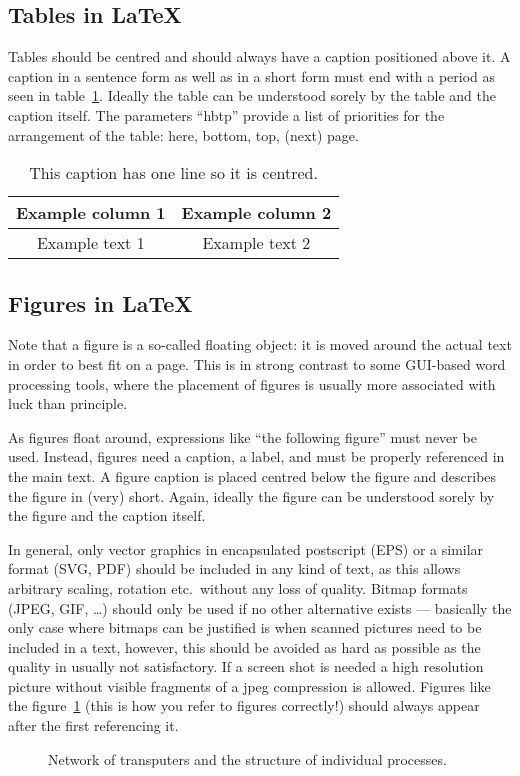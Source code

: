 \documentclass[12pt,twoside]{article}
\theoremstyle{plain}
\theoremstyle{definition}
\theoremstyle{remark}
\begin{document}
\subsection{Tables in \LaTeX}
\label{sec:model:subsec:tables}
Tables should be centred and should always have a caption positioned above it. A caption in a sentence form as well as in a short form must end with a period as seen in table~\ref{tab:sample}. Ideally the table can be understood sorely by the table and the caption itself. The parameters ``hbtp'' provide a list of priorities for the arrangement of the table: here, bottom, top, (next) page.

\begin{table}[hbtp] 
  \caption{This caption has one line so it is centred.}\label{tab:sample} 
  \centering
  \begin{tabular}{|c|c|}
    \hline
    Example column 1 & Example column 2 \\
    \hline
    Example text 1 & Example text 2 \\
    \hline
  \end{tabular}
\end{table}

\subsection{Figures in \LaTeX}
\label{sec:model:subsec:figures}
Note that a figure is a so-called floating object: it is moved around the actual text in order to best fit on a page. This is in strong contrast to some GUI-based word processing tools, where the placement of figures is usually more associated with luck than principle.

As figures float around, expressions like ``the following figure'' must never be used. Instead, figures need a caption, a label, and must be properly referenced in the main text. A figure caption is placed centred below the figure and describes the figure in (very) short. Again, ideally the figure can be understood sorely by the figure and the caption itself.

In general, only vector graphics in encapsulated postscript (EPS) or a similar format (SVG, PDF) should be included in any kind of text, as this allows arbitrary scaling, rotation etc.\ without any loss of quality. Bitmap formats (JPEG, GIF, \dots) should only be used if no other alternative exists --- basically the only case where bitmaps can be justified is when scanned pictures need to be included in a text, however, this should be avoided as hard as possible as the quality in usually not satisfactory. If a screen shot is needed a high resolution picture without visible fragments of a jpeg compression is allowed. Figures like the figure~\ref{fig:samplefig} (this is how you refer to figures correctly!) should always appear after the first referencing it.
\begin{figure}[hbtp]

	 {\caption{Network of transputers and the structure of individual
processes.}\label{fig:samplefig}}
\end{figure}
\end{document}
